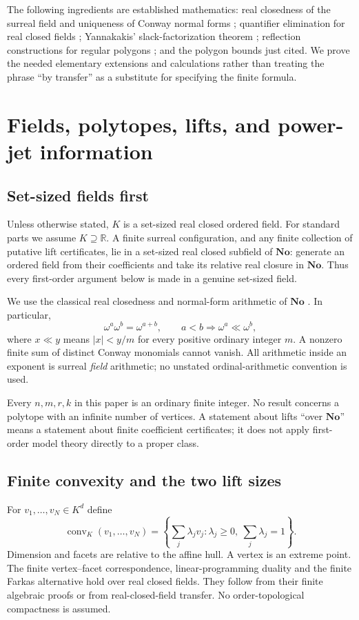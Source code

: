 \documentclass[11pt,a4paper]{article}
\numberwithin{equation}{section}
\theoremstyle{plain}
\newcommand{\No}{\mathbf{No}}
\newcommand{\R}{\mathbb R}
\newcommand{\conv}{\operatorname{conv}}
\begin{document}
The following ingredients are established mathematics: real closedness of
the surreal field and uniqueness of Conway normal forms \cite{bao:vDE};
quantifier elimination for real closed fields \cite{bao:Tarski,bao:Collins};
Yannakakis' slack-factorization theorem \cite{ic:yannakakis}; reflection
constructions for regular polygons \cite{ic:kp}; and the polygon bounds just
cited. We prove the needed elementary extensions and calculations rather
than treating the phrase ``by transfer'' as a substitute for specifying the
finite formula.

\section{Fields, polytopes, lifts, and power-jet information}\label{poly:ic:sec:setup}

\subsection{Set-sized fields first}
Unless otherwise stated, $K$ is a set-sized real closed ordered field.
For standard parts we assume $K\supseteq\R$. A finite surreal configuration,
and any finite collection of putative lift certificates, lie in a set-sized
real closed subfield of $\No$: generate an ordered field from their
coefficients and take its relative real closure in $\No$. Thus every
first-order argument below is made in a genuine set-sized field.

We use the classical real closedness and normal-form arithmetic of $\No$
\cite{ic:gonshor}. In particular,
\begin{equation}\label{poly:ic:eq:monomials}
 \omega^a\omega^b=\omega^{a+b},
 \qquad a<b\Longrightarrow \omega^a\ll\omega^b,
\end{equation}
where $x\ll y$ means $|x|<y/m$ for every positive ordinary integer $m$.
A nonzero finite sum of distinct Conway monomials cannot vanish. All
arithmetic inside an exponent is surreal \emph{field} arithmetic; no
unstated ordinal-arithmetic convention is used.

Every $n,m,r,k$ in this paper is an ordinary finite integer. No result
concerns a polytope with an infinite number of vertices. A statement about
lifts ``over $\No$'' means a statement about finite coefficient certificates;
it does not apply first-order model theory directly to a proper class.

\subsection{Finite convexity and the two lift sizes}
For $v_1,\ldots,v_N\in K^d$ define
\[
 \conv_K(v_1,\ldots,v_N)=
 \left\{\sum_j\lambda_jv_j:\lambda_j\geq0,
                         \ \sum_j\lambda_j=1\right\}.
\]
Dimension and facets are relative to the affine hull. A vertex is an extreme
point. The finite vertex--facet correspondence, linear-programming duality
and the finite Farkas alternative hold over real closed fields. They follow
from their finite algebraic proofs or from real-closed-field transfer.
No order-topological compactness is assumed.
\end{document}

